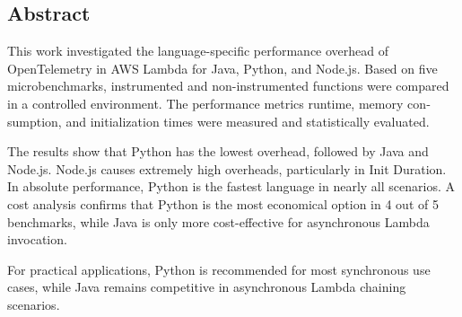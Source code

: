 

\begin{otherlanguage}{american}
	\chapter*{Abstract}
This work investigated the language-specific performance overhead of OpenTelemetry in AWS 
Lambda for Java, Python, and Node.js.
Based on five microbenchmarks, instrumented and non-instrumented functions were compared in 
a controlled environment.
The performance metrics runtime, memory consumption, and initialization times were measured and 
statistically evaluated.

The results show that Python has the lowest overhead, 
followed by Java and Node.js. Node.js causes extremely high overheads, particularly in Init Duration.
In absolute performance, Python is the fastest language in nearly all scenarios.
A cost analysis confirms that Python is the most economical option in 4 out of 5 benchmarks, 
while Java is only more cost-effective for asynchronous Lambda invocation.

For practical applications, Python is recommended for most synchronous use cases, while Java remains 
competitive in asynchronous Lambda chaining scenarios.
\end{otherlanguage}
